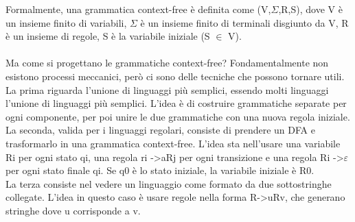 \documentclass[]{article}
\begin{document}
			Formalmente, una grammatica context-free è definita come (V,$\Sigma$,R,S), dove V è un insieme finito di variabili, $\Sigma$ è un insieme finito di terminali disgiunto da V, R è un insieme di regole, S è la variabile iniziale (S $\in$ V).\\\\
			Ma come si progettano le grammatiche context-free? Fondamentalmente non esistono processi meccanici, però ci sono delle tecniche che possono tornare utili.\\
			La prima riguarda l'unione di linguaggi più semplici, essendo molti linguaggi l'unione di linguaggi più semplici. L'idea è di costruire grammatiche separate per ogni componente, per poi unire le due grammatiche con una nuova regola iniziale.\\
			La seconda, valida per i linguaggi regolari, consiste di prendere un DFA e trasformarlo in una grammatica context-free. L'idea sta nell'usare una variabile Ri per ogni stato qi, una regola ri -\textgreater aRj per ogni transizione e una regola Ri -\textgreater $\varepsilon$ per ogni stato finale qi. Se q0 è lo stato iniziale, la variabile iniziale è R0.\\
			La terza consiste nel vedere un linguaggio come formato da due sottostringhe collegate. L'idea in questo caso è usare regole nella forma R-\textgreater uRv, che generano stringhe dove u corrisponde a v.
\end{document}
